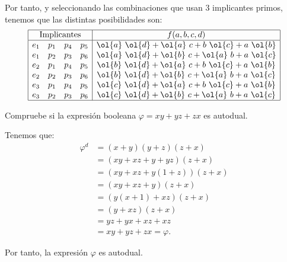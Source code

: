 \begin{ejercicio}
    Por tanto, y seleccionando las combinaciones que usan 3 implicantes primos, tenemos que las distintas posibilidades son:
    \begin{equation*}
        \begin{array}{|cccc|c|}
            \hline
            \multicolumn{4}{|c|}{\text{Implicantes}} & f(a,b,c,d) \\ \hline
            e_1 & p_1 & p_4 & p_5 & \ol{a}~\ol{d} + \ol{a}~c + b~\ol{c} + a~\ol{b} \\
            e_1 & p_2 & p_3 & p_6 & \ol{a}~\ol{d} + \ol{b}~c + \ol{a}~b + a~\ol{c} \\
            e_2 & p_1 & p_4 & p_5 & \ol{b}~\ol{d} + \ol{a}~c + b~\ol{c} + a~\ol{b} \\
            e_2 & p_2 & p_3 & p_6 & \ol{b}~\ol{d} + \ol{b}~c + \ol{a}~b + a~\ol{c} \\
            e_3 & p_1 & p_4 & p_5 & \ol{c}~\ol{d} + \ol{a}~c + b~\ol{c} + a~\ol{b} \\
            e_3 & p_2 & p_3 & p_6 & \ol{c}~\ol{d} + \ol{b}~c + \ol{a}~b + a~\ol{c} \\ \hline
        \end{array}
    \end{equation*}
\end{ejercicio}


\begin{ejercicio}
    Compruebe si la expresión booleana $\varphi=xy+yz+zx$ es autodual.

    Tenemos que:
    \begin{align*}
        \varphi^d &= (x+y)(y+z)(z+x)\\
        &= (xy + xz + y + yz)(z + x)\\
        &= (xy + xz + y(1+z))(z + x)\\
        &= (xy + xz + y)(z + x)\\
        &= (y(x+1) + xz)(z + x)\\
        &= (y + xz)(z + x)\\
        &= yz + yx + xz + xz\\
        &= xy + yz + zx = \varphi.
    \end{align*}

    Por tanto, la expresión $\varphi$ es autodual.
\end{ejercicio}